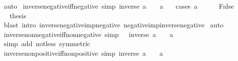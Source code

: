 \begin{isabellebody}
\isamarkupfalse%
\ auto%
\endisatagproof
{\isafoldproof}%
%
\isadelimproof
\isanewline
%
\endisadelimproof
\isanewline
{}\isamarkupfalse%
\ inverse{\isacharunderscore}{\kern0pt}negative{\isacharunderscore}{\kern0pt}iff{\isacharunderscore}{\kern0pt}negative\ {\isacharbrackleft}{\kern0pt}simp{\isacharbrackright}{\kern0pt}{\isacharcolon}{\kern0pt}\ {\isachardoublequoteopen}{\isacharparenleft}{\kern0pt}inverse\ a\ {\isacharless}{\kern0pt}\ {}{\isacharparenright}{\kern0pt}\ {\isacharequal}{\kern0pt}\ {\isacharparenleft}{\kern0pt}a\ {\isacharless}{\kern0pt}\ {}{\isacharparenright}{\kern0pt}{\isachardoublequoteclose}\isanewline
%
\isadelimproof
%
\endisadelimproof
%
\isatagproof
{}\isamarkupfalse%
\ {\isacharparenleft}{\kern0pt}cases\ {\isachardoublequoteopen}a\ {\isacharequal}{\kern0pt}\ {}{\isachardoublequoteclose}{\isacharparenright}{\kern0pt}\isanewline
\ \ \isamarkupfalse%
\ False\isanewline
\ \ \isamarkupfalse%
\ \isamarkupfalse%
\ {\isacharquery}{\kern0pt}thesis\isanewline
\ \ \ \ \isamarkupfalse%
\ {\isacharparenleft}{\kern0pt}blast\ intro{\isacharcolon}{\kern0pt}\ inverse{\isacharunderscore}{\kern0pt}negative{\isacharunderscore}{\kern0pt}imp{\isacharunderscore}{\kern0pt}negative\ negative{\isacharunderscore}{\kern0pt}imp{\isacharunderscore}{\kern0pt}inverse{\isacharunderscore}{\kern0pt}negative{\isacharparenright}{\kern0pt}\isanewline
{}\isamarkupfalse%
\ auto%
\endisatagproof
{\isafoldproof}%
%
\isadelimproof
\isanewline
%
\endisadelimproof
\isanewline
{}\isamarkupfalse%
\ inverse{\isacharunderscore}{\kern0pt}nonnegative{\isacharunderscore}{\kern0pt}iff{\isacharunderscore}{\kern0pt}nonnegative\ {\isacharbrackleft}{\kern0pt}simp{\isacharbrackright}{\kern0pt}{\isacharcolon}{\kern0pt}\ {\isachardoublequoteopen}{}\ {\isasymle}\ inverse\ a\ {\isasymlongleftrightarrow}\ {}\ {\isasymle}\ a{\isachardoublequoteclose}\isanewline
%
\isadelimproof
\ \ %
\endisadelimproof
%
\isatagproof
{}\isamarkupfalse%
\ {\isacharparenleft}{\kern0pt}simp\ add{\isacharcolon}{\kern0pt}\ not{\isacharunderscore}{\kern0pt}less\ {\isacharbrackleft}{\kern0pt}symmetric{\isacharbrackright}{\kern0pt}{\isacharparenright}{\kern0pt}%
\endisatagproof
{\isafoldproof}%
%
\isadelimproof
\isanewline
%
\endisadelimproof
\isanewline
{}\isamarkupfalse%
\ inverse{\isacharunderscore}{\kern0pt}nonpositive{\isacharunderscore}{\kern0pt}iff{\isacharunderscore}{\kern0pt}nonpositive\ {\isacharbrackleft}{\kern0pt}simp{\isacharbrackright}{\kern0pt}{\isacharcolon}{\kern0pt}\ {\isachardoublequoteopen}inverse\ a\ {\isasymle}\ {}\ {\isasymlongleftrightarrow}\ a\ {\isasymle}\ {}{\isachardoublequoteclose}\isanewline

\end{isabellebody}
